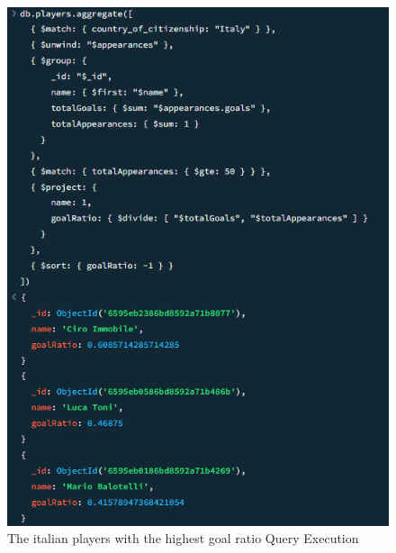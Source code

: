\documentclass{Configuration_Files/PoliMi3i_thesis}
\begin{document}
\begin{figure}[htbp]
    \centering
    \includegraphics[scale=0.7]{Images/Queries/Italian_ratio_goals/irg.png}
    \caption{The italian players with the highest goal ratio Query Execution}
\end{figure}
  
\end{document}
